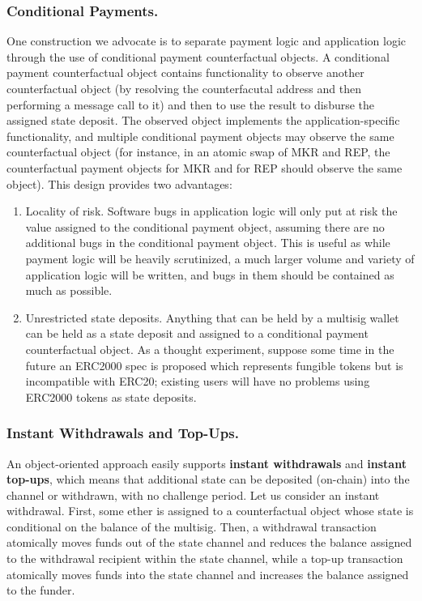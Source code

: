 \documentclass[prb,floatfix,reprint,nofootinbib,amsmath,amssymb,epsfig,pre,floats,letterpaper,groupedaffiliation,tightenlines,allcolors=blue,11pt]{revtex4}
\theoremstyle{definition}
\theoremstyle{definition}
\theoremstyle{definition}
\begin{document}
\subsubsection{Conditional Payments.} One construction we advocate is to separate payment logic and application logic through the use of conditional payment counterfactual objects. A conditional payment counterfactual object contains functionality to observe another counterfactual object (by resolving the counterfacutal address and then performing a message call to it) and then to use the result to disburse the assigned state deposit. The observed object implements the application-specific functionality, and multiple conditional payment objects may observe the same counterfactual object (for instance, in an atomic swap of MKR and REP, the counterfactual payment objects for MKR and for REP should observe the same object). This design provides two advantages:

\begin{enumerate}
    \item Locality of risk. Software bugs in application logic will only put at risk the value assigned to the conditional payment object, assuming there are no additional bugs in the conditional payment object. This is useful as while payment logic will be heavily scrutinized, a much larger volume and variety of application logic will be written, and bugs in them should be contained as much as possible.
    \item Unrestricted state deposits. Anything that can be held by a multisig wallet can be held as a state deposit and assigned to a conditional payment counterfactual object. As a thought experiment, suppose some time in the future an ERC2000 spec is proposed which represents fungible tokens but is incompatible with ERC20; existing users will have no problems using ERC2000 tokens as state deposits.
\end{enumerate}

\subsubsection{Instant Withdrawals and Top-Ups.} An object-oriented approach easily supports \textbf{instant withdrawals} and \textbf{instant top-ups}, which means that additional state can be deposited (on-chain) into the channel or withdrawn, with no challenge period. Let us consider an instant withdrawal. First, some ether is assigned to a counterfactual object whose state is conditional on the balance of the multisig. Then, a withdrawal transaction atomically moves funds out of the state channel and reduces the balance assigned to the withdrawal recipient within the state channel, while a top-up transaction atomically moves funds into the state channel and increases the balance assigned to the funder.
\end{document}
